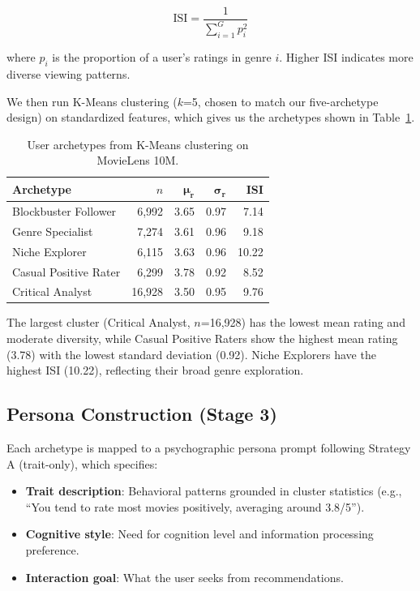 \documentclass[sigconf,nonacm]{acmart}
\begin{document}
\begin{equation}
\text{ISI} = \frac{1}{\sum_{i=1}^{G} p_i^2}
\end{equation}

where $p_i$ is the proportion of a user's ratings in genre $i$. Higher ISI indicates more diverse viewing patterns.

We then run K-Means clustering ($k$=5, chosen to match our five-archetype design) on standardized features, which gives us the archetypes shown in Table~\ref{tab:archetypes}.

\begin{table}[t]
\caption{User archetypes from K-Means clustering on MovieLens 10M.}
\label{tab:archetypes}
\small
\begin{tabular}{lrrrr}
\toprule
\textbf{Archetype} & \textbf{$n$} & $\boldsymbol{\mu_r}$ & $\boldsymbol{\sigma_r}$ & \textbf{ISI} \\
\midrule
Blockbuster Follower & 6,992 & 3.65 & 0.97 & 7.14 \\
Genre Specialist & 7,274 & 3.61 & 0.96 & 9.18 \\
Niche Explorer & 6,115 & 3.63 & 0.96 & 10.22 \\
Casual Positive Rater & 6,299 & 3.78 & 0.92 & 8.52 \\
Critical Analyst & 16,928 & 3.50 & 0.95 & 9.76 \\
\bottomrule
\end{tabular}
\end{table}

The largest cluster (Critical Analyst, $n$=16,928) has the lowest mean rating and moderate diversity, while Casual Positive Raters show the highest mean rating (3.78) with the lowest standard deviation (0.92). Niche Explorers have the highest ISI (10.22), reflecting their broad genre exploration.

\subsection{Persona Construction (Stage 3)}

Each archetype is mapped to a psychographic persona prompt following Strategy A (trait-only), which specifies:

\begin{itemize}[leftmargin=*]
\item \textbf{Trait description}: Behavioral patterns grounded in cluster statistics (e.g., ``You tend to rate most movies positively, averaging around 3.8/5'').
\item \textbf{Cognitive style}: Need for cognition level and information processing preference.
\item \textbf{Interaction goal}: What the user seeks from recommendations.
\end{itemize}
\end{document}
